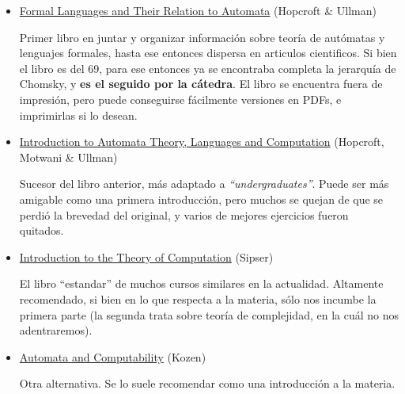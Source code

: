 \documentclass[spanish]{article}
\theoremstyle{definition}
\begin{document}
\begin{itemize}
  \item \underline{Formal Languages and Their Relation to Automata} (Hopcroft \& Ullman)

Primer libro en juntar y organizar información sobre teoría de autómatas y
lenguajes formales, hasta ese entonces dispersa en articulos cientificos. Si
bien el libro es del 69, para ese entonces ya se encontraba completa la
jerarquía de Chomsky, y \textbf{es el seguido por la cátedra}.
El libro se encuentra fuera de impresión, pero puede conseguirse fácilmente
versiones en PDFs, e imprimirlas si lo desean.

\item \underline{Introduction to Automata Theory, Languages and Computation} (Hopcroft,
  Motwani \& Ullman)

  Sucesor del libro anterior, más adaptado a \textit{``undergraduates''}. Puede
  ser más amigable como una primera introducción, pero muchos se quejan de que
  se perdió la brevedad del original, y varios de mejores ejercicios fueron
  quitados.~\cite{wikiCinderella}

\item \underline{Introduction to the Theory of Computation} (Sipser)
  
  El libro ``estandar'' de muchos cursos similares en la actualidad. Altamente
  recomendado, si bien en lo que respecta a la materia, sólo nos incumbe la
  primera parte (la segunda trata sobre teoría de complejidad, en la cuál no
  nos adentraremos).

\item \underline{Automata and Computability} (Kozen)

  Otra alternativa. Se lo suele recomendar como una introducción a la materia.

\end{itemize}



\end{document}

